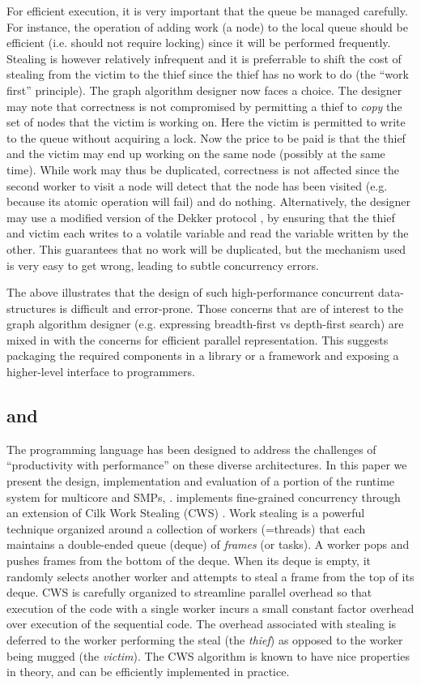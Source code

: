 For efficient execution, it is very important that the queue be
managed carefully. For instance, the operation of adding work (a node)
to the local queue should be efficient (i.e.{} should not require
locking) since it will be performed frequently. Stealing is however
relatively infrequent and it is preferrable to shift the cost of
stealing from the victim to the thief since the thief has no work to
do (the ``work first'' principle). The graph algorithm designer now
faces a choice. The designer may note \cite{BC04a} that correctness is
not compromised by permitting a thief to {\em copy} the set of nodes
that the victim is working on. Here the victim is permitted to write
to the queue without acquiring a lock. Now the price to be paid is
that the thief and the victim may end up working on the same node
(possibly at the same time).  While work may thus be duplicated,
correctness is not affected since the second worker to visit a node
will detect that the node has been visited (e.g.{} because its atomic
operation will fail) and do nothing. Alternatively, the designer may
use a modified version of the Dekker protocol \cite{BJKLRZ95}, by ensuring
that the thief and victim each writes to a volatile variable and read
the variable written by the other. This guarantees that no work will
be duplicated, but the mechanism used is very easy to get wrong,
leading to subtle concurrency errors.

The above illustrates that the design of such high-performance
concurrent data-structures is difficult and error-prone. Those
concerns that are of interest to the graph algorithm designer (e.g.{}
expressing breadth-first vs depth-first search) are mixed in with the
concerns for efficient parallel representation.  This suggests
packaging the required components in a library or a framework and
exposing a higher-level interface to programmers.

\subsection{\Xten{} and \XWS}
The \Xten{} programming language \cite{x10} has
been designed to address the challenges of ``productivity with
performance'' on these diverse architectures.  In this paper we
present the design, implementation and evaluation of a portion of the
\Xten{} runtime system for multicore and SMPs, \XWS{}. \XWS{}
implements fine-grained concurrency through an extension of Cilk Work
Stealing (CWS) \cite{BJKLRZ95}.  Work stealing is a powerful technique
organized around a collection of workers (=threads) that each
maintains a double-ended queue (deque) of {\em frames} (or tasks). A
worker pops and pushes frames from the bottom of the deque. When its
deque is empty, it randomly selects another worker and attempts to
steal a frame from the top of its deque. CWS is carefully organized to
streamline parallel overhead so that execution of the code with a
single worker incurs a small constant factor overhead over execution
of the sequential code. The overhead associated with stealing is
deferred to the worker performing the steal (the {\em thief}) as
opposed to the worker being mugged (the {\em victim}). The CWS
algorithm is known to have nice properties in theory, and can be
efficiently implemented in practice.

